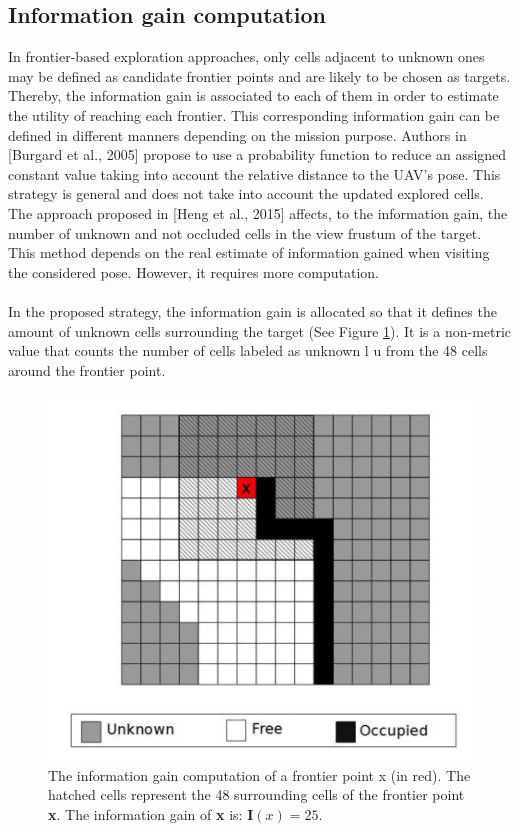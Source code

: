 \documentclass[11pt,openany]{book}
\begin{document}
\subsection{Information gain computation}
In frontier-based exploration approaches, only cells adjacent to unknown ones may be deﬁned as candidate frontier points and are likely to be chosen as targets. Thereby, the information gain is associated to each of them in order to estimate the utility of reaching each frontier. This corresponding information gain can be deﬁned in diﬀerent manners depending on the mission purpose. Authors in [Burgard et al., 2005] propose to use a probability function to reduce an assigned constant value taking into account the relative distance to the UAV’s pose. This strategy is general and does not take into account the updated explored cells. The approach proposed in [Heng et al., 2015] aﬀects, to the information gain, the number of unknown and not occluded cells in the view frustum of the target. This method depends on the real estimate of information gained when visiting the considered pose. However, it requires more computation.\\\\
In the proposed strategy, the information gain is allocated so that it deﬁnes the amount of unknown cells surrounding the target (See Figure \ref{fig:3.4}). It is a non-metric value that counts the number of cells labeled as unknown l u from the 48 cells around the frontier point.
\begin{figure}[H]
    \centering
    \includegraphics[scale=0.4]{assets/3_4.png}
    \caption{The information gain computation of a frontier point x (in red). The hatched cells represent the 48 surrounding cells of the frontier point \textbf{x}. The information gain of \textbf{x} is: $\mathbf{I}(x)=25$.}
    \label{fig:3.4}
\end{figure}
\end{document}
